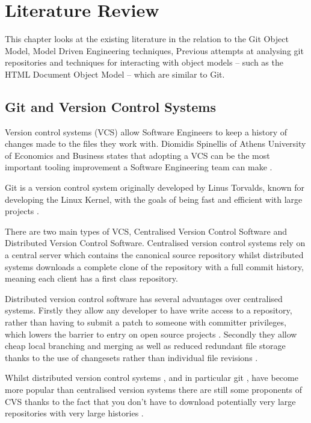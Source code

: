 \documentclass[11pt]{book}
\begin{document}
\chapter{Literature Review}
\label{litreview}
This chapter looks at the existing literature in the relation to the Git Object Model, Model Driven Engineering techniques, Previous attempts at analysing git repositories and techniques for interacting with object models -- such as the HTML Document Object Model -- which are similar to Git.

\section{Git and Version Control Systems}
Version control systems (VCS) allow Software Engineers to keep a history of changes made to the files they work with. Diomidis Spinellis of Athens University of Economics and Business states that adopting a VCS can be the most important tooling improvement a Software Engineering team can make \cite{toolsofthetrade}.

Git is a version control system originally developed by Linus Torvalds, known for developing the Linux Kernel, with the goals of being fast and efficient with large projects \cite{progit}.

There are two main types of VCS, Centralised Version Control Software and Distributed Version Control Software. Centralised version control systems rely on a central server which contains the canonical source repository whilst distributed systems downloads a complete clone of the repository with a full commit history, meaning each client has a first class repository\cite{whydistributed}.

Distributed version control software has several advantages over centralised systems. Firstly they allow any developer to have write access to a repository, rather than having to submit a patch to someone with committer privileges, which lowers the barrier to entry on open source projects \cite{distributedimpactoss}. Secondly they allow cheap local branching and merging as well as reduced redundant file storage thanks to the use of changesets rather than individual file revisions \cite{distributedimpactoss}. 

Whilst distributed version control systems \cite{whydistributed}, and in particular git \cite{gitpopularity}, have become more popular than centralised version systems there are still some proponents of CVS thanks to the fact that you don't have to download potentially very large repositories with very large histories \cite{cvsvsvcs}.
\end{document}
